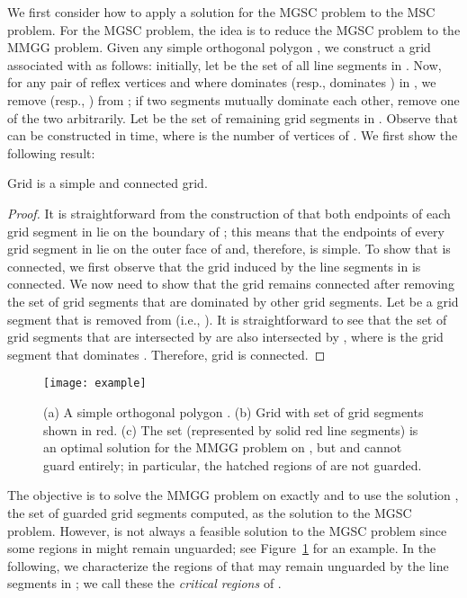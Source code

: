\documentclass{llncs}
\begin{document}
We first consider how to apply a solution for the MGSC problem to the MSC problem.
For the MGSC problem, the idea is to reduce the MGSC problem to the MMGG problem.
Given any simple orthogonal polygon , 
we construct a grid  associated with  as follows: initially, let  be the
set of all line segments in . Now, for any pair of reflex vertices
 and  where  dominates  (resp.,  dominates ) in , we remove
 (resp., ) from ; if two segments mutually dominate each other, remove
one of the two arbitrarily. Let  be the set of remaining grid segments in . Observe that 
can be constructed in  time, where  is the number of vertices of . We first show the following result:

\begin{lemma}
\label{lem:gIsSimple}Grid  is a simple and connected grid.
\end{lemma}
\begin{proof}
It is straightforward from the construction of  that both endpoints of each grid
segment in  lie on the boundary of ; this means that the endpoints of every grid
segment in  lie on the outer face of  and, therefore,  is simple. To show that 
is connected, we first observe that the grid induced by the line segments in  is connected.
We now need to show that the grid remains connected after removing the set of grid
segments that are dominated by other grid segments. Let  be a grid segment
that is removed from  (i.e., ). It is straightforward to see that the set of
grid segments that are intersected by  are also intersected by , where 
is the grid segment that dominates . Therefore, grid  is connected.
\end{proof}
\begin{figure}[t]
\centering \texttt{[image: example]}
\caption{(a) A simple orthogonal polygon .
(b) Grid  with set  of grid segments shown in red. (c) The set
 (represented by solid red line segments) is an optimal solution for the MMGG problem
on , but  and  cannot guard  entirely; in particular, the hatched regions of  are not guarded.}
\label{fig:notEquivalent}\end{figure}

The objective is to solve the MMGG problem on  exactly
and to use the solution , the set of guarded grid segments computed, as the solution to the MGSC problem.
However,  is not always a feasible solution to the MGSC problem since some regions in 
might remain unguarded; see Figure~\ref{fig:notEquivalent}
for an example. In the following, we characterize the regions of  that may remain unguarded by the line segments in ;
we call these the \emph{critical regions} of .
\end{document}
